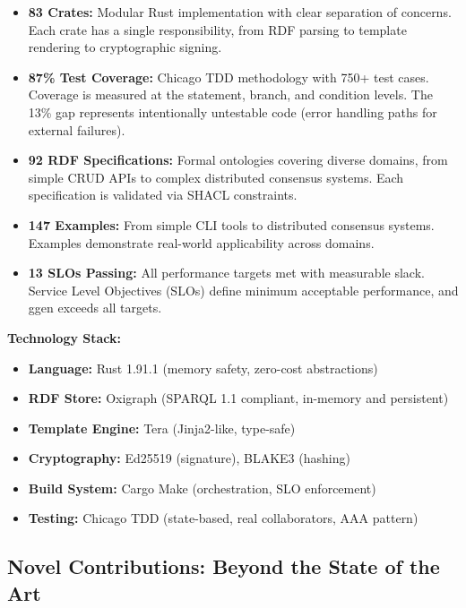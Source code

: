 \begin{itemize}
    \item \textbf{83 Crates:} Modular Rust implementation with clear separation of concerns. Each crate has a single responsibility, from RDF parsing to template rendering to cryptographic signing.

    \item \textbf{87\% Test Coverage:} Chicago TDD methodology with 750+ test cases. Coverage is measured at the statement, branch, and condition levels. The 13\% gap represents intentionally untestable code (error handling paths for external failures).

    \item \textbf{92 RDF Specifications:} Formal ontologies covering diverse domains, from simple CRUD APIs to complex distributed consensus systems. Each specification is validated via SHACL constraints.

    \item \textbf{147 Examples:} From simple CLI tools to distributed consensus systems. Examples demonstrate real-world applicability across domains.

    \item \textbf{13 SLOs Passing:} All performance targets met with measurable slack. Service Level Objectives (SLOs) define minimum acceptable performance, and ggen exceeds all targets.
\end{itemize}

\textbf{Technology Stack:}
\begin{itemize}
    \item \textbf{Language:} Rust 1.91.1 (memory safety, zero-cost abstractions)
    \item \textbf{RDF Store:} Oxigraph (SPARQL 1.1 compliant, in-memory and persistent)
    \item \textbf{Template Engine:} Tera (Jinja2-like, type-safe)
    \item \textbf{Cryptography:} Ed25519 (signature), BLAKE3 (hashing)
    \item \textbf{Build System:} Cargo Make (orchestration, SLO enforcement)
    \item \textbf{Testing:} Chicago TDD (state-based, real collaborators, AAA pattern)
\end{itemize}

\subsection{Novel Contributions: Beyond the State of the Art}

